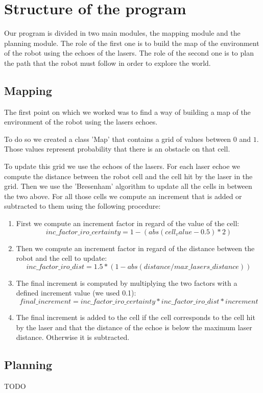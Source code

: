 \section{Structure of the program}

Our program is divided in two main modules, the mapping module and the planning module.
The role of the first one is to build the map of the environment of the robot using the echoes of the lasers.
The role of the second one is to plan the path that the robot must follow in order to explore the world.

\subsection{Mapping}

The first point on which we worked was to find a way of building a map of the environment of the robot using the lasers echoes.

To do so we created a class 'Map' that contains a grid of values between $0$ and $1$.
Those values represent probability that there is an obstacle on that cell.

To update this grid we use the echoes of the lasers.
For each laser echoe we compute the distance between the robot cell and the cell hit by the laser in the grid.
Then we use the 'Bresenham' algorithm to update all the cells in between the two above.
For all those cells we compute an increment that is added or subtracted to them using the following procedure:

\begin{enumerate}
    \item First we compute an increment factor in regard of the value of the cell:
        $$
        inc\_factor\_iro\_certainty = 1 - (abs(cell_value - 0.5) * 2)
        $$
    \item Then we compute an increment factor in regard of the distance between the robot and the cell to update:
        $$
        inc\_factor\_iro\_dist = 1.5 * (1 - abs(distance / max\_lasers\_distance))
        $$
    \item The final increment is computed by multiplying the two factors with a defined increment value (we used 0.1):
        $$
        final\_increment = inc\_factor\_iro\_certainty * inc\_factor\_iro\_dist * increment
        $$
    \item The final increment is added to the cell if the cell corresponds to the cell hit by the laser and that the distance of the echoe is below the maximum laser distance.
        Otherwise it is subtracted.
\end{enumerate}

\subsection{Planning}

TODO

